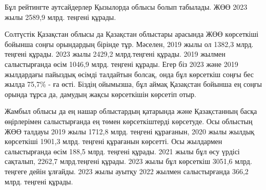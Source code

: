 \begin{multicols}{2}
Бұл рейтингте аутсайдерлер Қызылорда облысы болып табылады. ЖӨӨ 2023
жылы 2589,9 млрд. теңгені құрады.

Солтүстік Қазақстан облысы да Қазақстан облыстары арасында ЖӨӨ
көрсеткіші бойынша соңғы орындардың бірінде тұр. Мәселен, 2019 жылы ол
1382,3 млрд. теңгені құрады. 2023 жылы 2429,2 млрд.теңгені құрады. 2019
жылмен салыстырғанда өсім 1046,9 млрд. теңгені құрады. Егер біз 2023
және 2019 жылдардағы пайыздық өсімді талдайтын болсақ, онда бұл
көрсеткіш соңғы бес жылда 75,7\% - ға өсті. Біздің ойымызша, бұл аймақ
Қазақстан бойынша ең соңғы орында тұрса да, дамудың жақсы көрсеткішін
көрсетіп отыр.

Жамбыл облысы да ең нашар облыстардың қатарында және Қазақстанның басқа
өңірлерімен салыстырғанда ең төмен көрсеткіштерді көрсетуде. Осы
облыстың ЖӨӨ талдауы 2019 жылы 1712,8 млрд. теңгені құрағанын, 2020 жылы
жылдық көрсеткіші 1901,3 млрд. теңгені құрағанын көрсетті. Осы жылдармен
салыстырғанда өсім 188,5 млрд. теңгені құрады. 2021 жылы бұл өсу үрдісі
сақталып, 2262,7 млрд.теңгені құрады. 2023 жылы бұл көрсеткіш 3051,6
млрд. теңгеге дейін ұлғайды. 2023 жылы ауытқу 2022 жылмен салыстырғанда
366,2 млрд. теңгені құрады.
\end{multicols}

